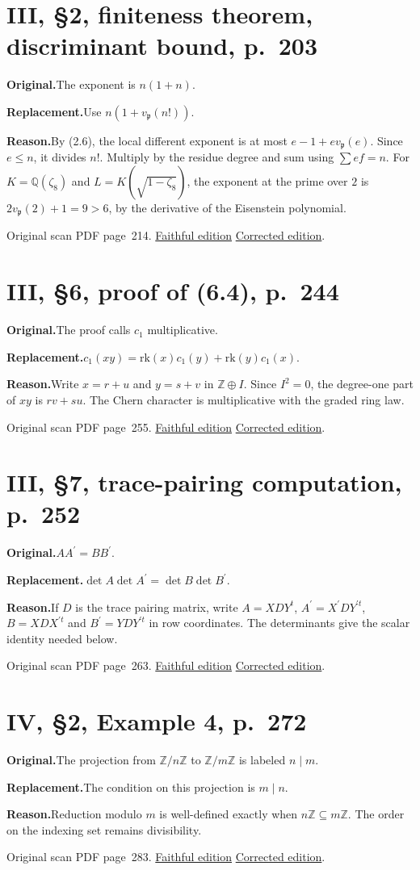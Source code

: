 \documentclass[11pt,a4paper]{article}
\newcommand{\original}{\par\smallskip\noindent\textbf{Original.}\enspace}
\newcommand{\replacement}{\par\smallskip\noindent\textbf{Replacement.}\enspace}
\newcommand{\reason}{\par\smallskip\noindent\textbf{Reason.}\enspace}
\newcommand{\editionlink}[3]{\href{#1\#errata.#2}{#3}}
\newcommand{\location}[2]{%
  \par\smallskip\noindent Original scan PDF page~#2.\enspace
  \editionlink{Neukirch_Faithful.pdf}{#1}{Faithful edition}
  \quad\editionlink{Neukirch_Corrected.pdf}{#1}{Corrected edition}.}
\begin{document}
\setcounter{section}{21}
\section{III, \S2, finiteness theorem, discriminant bound, p.~203}\label{errata:item:22}
\original The exponent is $n(1+n)$.
\replacement Use $n(1+v_{\mathfrak p}(n!))$.
\reason By (2.6), the local different exponent is at most $e-1+e v_{\mathfrak p}(e)$. Since $e\le n$, it divides $n!$. Multiply by the residue degree and sum using $\sum ef=n$. For $K=\mathbb Q(\zeta_8)$ and $L=K(\sqrt{1-\zeta_8})$, the exponent at the prime over $2$ is $2v_{\mathfrak p}(2)+1=9>6$, by the derivative of the Eisenstein polynomial.
\location{22}{214}

\setcounter{section}{22}
\section{III, \S6, proof of (6.4), p.~244}\label{errata:item:23}
\original The proof calls $c_1$ multiplicative.
\replacement $c_1(xy)=\mathrm{rk}(x)c_1(y)+\mathrm{rk}(y)c_1(x)$.
\reason Write $x=r+u$ and $y=s+v$ in $\mathbb Z\oplus I$. Since $I^2=0$, the degree-one part of $xy$ is $rv+su$. The Chern character is multiplicative with the graded ring law.
\location{23}{255}

\setcounter{section}{23}
\section{III, \S7, trace-pairing computation, p.~252}\label{errata:item:24}
\original $AA^{\prime}=BB^{\prime}$.
\replacement $\det A\det A^{\prime}=\det B\det B^{\prime}$.
\reason If $D$ is the trace pairing matrix, write $A=XDY^t$, $A^{\prime}=X^{\prime}DY^{\prime t}$, $B=XDX^{\prime t}$ and $B^{\prime}=YDY^{\prime t}$ in row coordinates. The determinants give the scalar identity needed below.
\location{24}{263}

\setcounter{section}{24}
\section{IV, \S2, Example 4, p.~272}\label{errata:item:25}
\original The projection from $\mathbb Z/n\mathbb Z$ to $\mathbb Z/m\mathbb Z$ is labeled $n\mid m$.
\replacement The condition on this projection is $m\mid n$.
\reason Reduction modulo $m$ is well-defined exactly when $n\mathbb Z\subseteq m\mathbb Z$. The order on the indexing set remains divisibility.
\location{25}{283}
\end{document}
